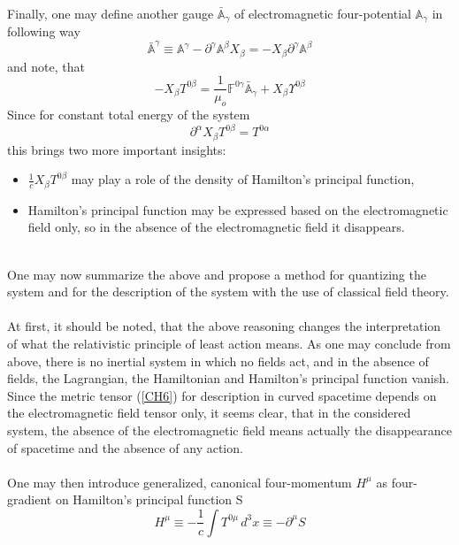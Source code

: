 \documentclass[aps,prx,preprint,groupedaddress,showkeys]{revtex4-2}
\begin{document}
~\\
Finally, one may define another gauge $\bar{\mathbb{A}}_{\gamma}$ of electromagnetic four-potential $\mathbb{A}_{\gamma}$ in following way
\begin{equation} \label{HQ6}
\bar{\mathbb{A}}^{\gamma} \equiv  \mathbb{A}^{\gamma} - \partial^{\gamma} \mathbb{A}^{\beta}X_{\beta} = - X_{\beta} \partial^{\gamma} \mathbb{A}^{\beta}
\end{equation}
and note, that
\begin{equation} \label{HQ7}
- X_{\beta} T^{0 \beta} =  \frac{1}{\mu_o} \mathbb{F}^{0 \gamma} \bar{\mathbb{A}}_{\gamma} + X_{\beta} \Upsilon^{0 \beta}
\end{equation}
Since for constant total energy of the system
\begin{equation} \label{HQ8}
\partial^{\alpha} X_{\beta} T^{0 \beta} =  T^{0 \alpha}
\end{equation}
this brings two more important insights: 
\begin{itemize}
  \item $\frac{1}{c}X_{\beta} T^{0 \beta}$ may play a role of the density of Hamilton's principal function,
  \item Hamilton's principal function may be expressed based on the electromagnetic field only, so in the absence of the electromagnetic field it disappears.
\end{itemize}
~\\
One may now summarize the above and propose a method for quantizing the system and for the description of the system with the use of classical field theory.\\
~\\
At first, it should be noted, that the above reasoning changes the interpretation of what the relativistic principle of least action means. As one may conclude from above, there is no inertial system in which no fields act, and in the absence of fields, the Lagrangian, the Hamiltonian and Hamilton's principal function vanish. Since the metric tensor (\ref{CH6}) for description in curved spacetime depends on the electromagnetic field tensor only, it seems clear, that in the considered system, the absence of the electromagnetic field means actually the disappearance of spacetime and the absence of any action.\\
~\\
One may then introduce generalized, canonical four-momentum $H^{\mu}$ as four-gradient on Hamilton's principal function S
\begin{equation} \label{Q2}
H^{\mu} \equiv - \frac{1}{c} \int T^{0 \mu} \, d^3 x \equiv -\partial^{\mu} S
\end{equation}
\end{document}
